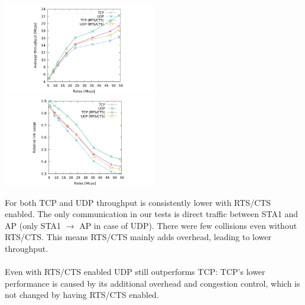 \includegraphics[width=0.5\textwidth]{traces/L3-3-1-tput.pdf}
\includegraphics[width=0.5\textwidth]{traces/L3-3-1-usage.pdf}

For both TCP and UDP throughput is consistently lower with RTS/CTS enabled. The only communication in our tests is direct traffic between STA1 and AP (only STA1 $\rightarrow$ AP in case of UDP). There were few collisions even without RTS/CTS. This means RTS/CTS mainly adds overhead, leading to lower throughput. \\ \\ Even with RTS/CTS enabled UDP still outperforms TCP: TCP's lower performance is caused by its additional overhead and congestion control, which is not changed by having RTS/CTS enabled.
